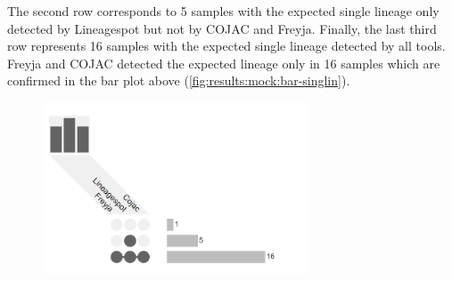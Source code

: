                 The second row corresponds to 5 samples with the expected single lineage only detected by Lineagespot but not by COJAC and Freyja. Finally, the last third row represents 16 samples with the expected single lineage detected by all tools. Freyja and COJAC detected the expected lineage only in 16 samples which are confirmed in the bar plot above (\cref{fig:results:mock:bar-singlin}).
                \begin{figure}[ht!]
                	\centering
                    \includegraphics[width=0.7\textwidth]{figures/results/mock/venn-singlin.png}
                    \label{fig:results:mock:venn-singlin}
                \end{figure}

